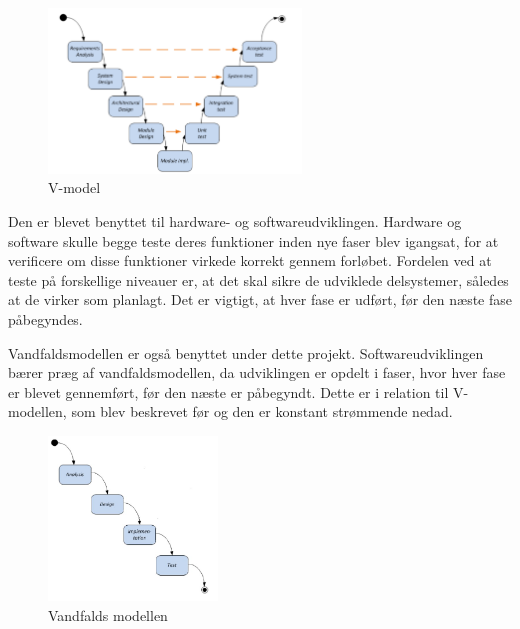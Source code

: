\begin{figure}[H]
	\centering
	\includegraphics[width=0.6\textwidth]{Figurer/VModellen}
	\caption{V-model}
	\label{fig:V_Modellen}
\end{figure}

Den er blevet benyttet til hardware- og softwareudviklingen. Hardware og software skulle begge teste deres funktioner inden nye faser blev igangsat, for at verificere om disse funktioner virkede korrekt gennem forløbet. Fordelen ved at teste på forskellige niveauer er, at det skal sikre de udviklede delsystemer, således at de virker som planlagt. Det er vigtigt, at hver fase er udført, før den næste fase påbegyndes. 
\newline

Vandfaldsmodellen \cite{ISE} er også benyttet under dette projekt. Softwareudviklingen bærer præg af vandfaldsmodellen, da udviklingen er opdelt i faser, hvor hver fase er blevet gennemført, før den næste er påbegyndt. Dette er i relation til V-modellen, som blev beskrevet før og den er konstant strømmende nedad. 

\begin{figure}[H]
	\centering
	\includegraphics[width=0.4\textwidth]{Figurer/VandfaldsModellen}
	\caption{Vandfalds modellen}
	\label{fig:vandfalds_model}
\end{figure}


